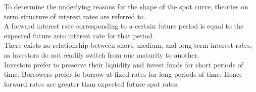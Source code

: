 To determine the underlying reasons for the shape of the spot curve, theories on term structure of interest rates are referred to.\\

 A forward interest rate corresponding to a certain future period is equal to the expected future zero interest rate for that period.\\

 There exists no relationship between short, medium, and long-term interest rates, as investors do not readily switch from one maturity to another.\\

 Investors prefer to preserve their liquidity and invest funds for short periods of time. Borrowers prefer to borrow at fixed rates for long periods of time. Hence forward rates are greater than expected future spot rates.




